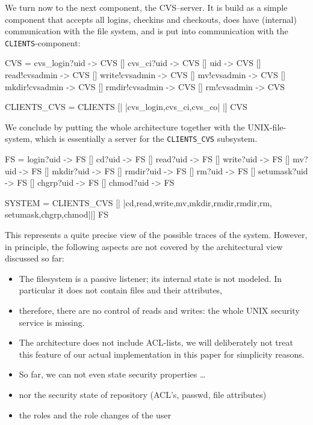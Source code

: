 We turn now to the next component, the CVS--server.
It is build as a simple component that accepts all 
logins, checkins   and checkouts, does have (internal) communication with the
file system, and is put into communication with the \texttt{CLIENTS}-component:
\begin{cspverb}
   CVS      = cvs_login?uid  -> CVS []  
              cvs_ci?uid     -> CVS []
              uid            -> CVS []  
              read!cvsadmin  -> CVS []  
              write!cvsadmin -> CVS []  
              mv!cvsadmin    -> CVS [] 
              mkdir!cvsadmin -> CVS []  
              rmdir!cvsadmin -> CVS []  
              rm!cvsadmin    -> CVS

   CLIENTS_CVS = CLIENTS [| {|cvs_login,cvs_ci,cvs_co|} |] CVS
\end{cspverb}
We conclude by putting the whole architecture together with the UNIX-file-
system, which is essentially a server for the \texttt{CLIENTS\_CVS} subsystem.
\begin{cspverb}
   FS    =    login?uid     -> FS [] 
              cd?uid        -> FS []  
              read?uid      -> FS []  
              write?uid     -> FS []  
              mv?uid        -> FS [] 
              mkdir?uid     -> FS []  
              rmdir?uid     -> FS []  
              rm?uid        -> FS [] 
              setumask?uid  -> FS []  
              chgrp?uid     -> FS []  
              chmod?uid     -> FS 

   SYSTEM = CLIENTS_CVS 
              [| {|cd,read,write,mv,mkdir,rmdir,rmdir,rm,
                 setumask,chgrp,chmod|}|] 
            FS
\end{cspverb}
This represents a quite precise view of the possible traces of the system.
However, in principle, the following aspects are not covered by the 
architectural view discussed so far:
\begin{itemize}
    \item The filesystem is a passive listener; its internal state
          is not modeled. In particular it does not contain files
          and their attributes,
    \item therefore, there are no control of reads and writes: 
          the whole UNIX security service is missing.
    \item The architecture does not include ACL-lists,
          we will deliberately not treat this feature of
          our actual implementation in this paper for
          simplicity reasons.
    \item So far, we can not even state security properties \ldots 
    \item nor the security state of repository (ACL's, passwd, file attributes)
    \item the roles and the role changes of the user
\end{itemize}
